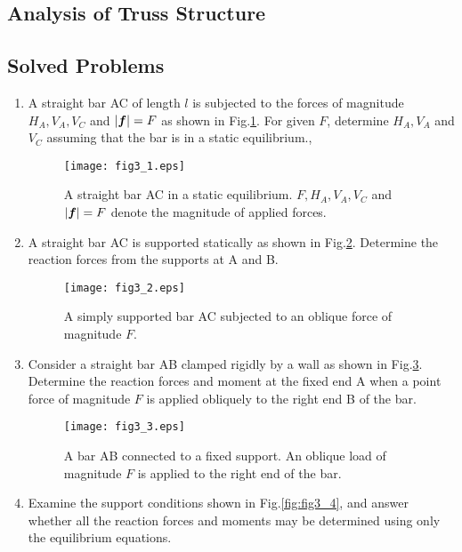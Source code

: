 \documentclass[10pt,a4j]{article}
\begin{document}
\subsection{Analysis of Truss Structure}
\subsection{Solved Problems}
\begin{enumerate}
\item
A straight bar AC of length $l$ is subjected to the forces of magnitude  
$H_A, V_A, V_C$ and $|\mbox{\boldmath $f$}|=F$ as shown in Fig.\ref{fig:fig3_1}. 
For given $F$, determine $H_A, V_A$ and $V_C$ assuming that the bar is in a static equilibrium.,
\begin{figure}[h]
	\begin{center}
	\texttt{[image: fig3\_1.eps]} 
	\end{center}
	\caption{A straight bar AC in a static equilibrium. 
	$F, H_A, V_A, V_C$ and $|\mbox{\boldmath $f$}|=F$ denote the magnitude of applied forces.
	}
	\label{fig:fig3_1}
\end{figure}
\item
A straight bar AC is supported statically as shown in Fig.\ref{fig:fig3_2}. 
Determine the reaction forces from the supports at A and B. 
\begin{figure}[h]
	\begin{center}
	\texttt{[image: fig3\_2.eps]} 
	\end{center}
	\caption{A simply supported bar AC subjected to an oblique force of magnitude $F$.}
	\label{fig:fig3_2}
\end{figure}
\item
Consider a straight bar AB clamped rigidly by a wall as shown in Fig.\ref{fig:fig3_3}.
Determine the reaction forces and moment at the fixed end A  when 
a point force of magnitude $F$ is applied obliquely to the right end B of the bar.  
\begin{figure}[h]
	\begin{center}
	\texttt{[image: fig3\_3.eps]} 
	\end{center}
	\caption{A bar AB connected to a fixed support. 
	An oblique load of magnitude $F$ is applied to the right end of the bar.} 
	\label{fig:fig3_3}
\end{figure}
\item
Examine the support conditions shown in Fig.\ref{fig:fig3_4}, and answer whether 
all the reaction forces and moments may be determined using only the equilibrium equations. 

\end{enumerate}
\end{document}

